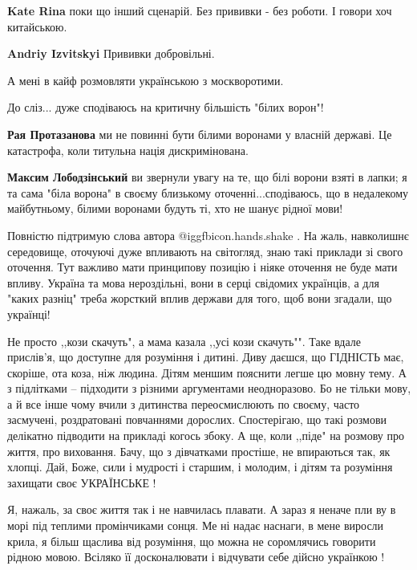 \begin{itemize}
\begin{itemize}
\textbf{Kate Rina} поки що інший сценарій. Без прививки - без роботи. І говори хоч китайською.

\textbf{Andriy Izvitskyi} Прививки добровільні.
\end{itemize} %

А мені в кайф розмовляти українською з москворотими.

До сліз... дуже сподіваюсь на критичну більшість "білих ворон"!

\begin{itemize} %
\textbf{Рая Протазанова} ми не повинні бути білими воронами у власній державі. Це катастрофа, коли титульна нація дискримінована.

\textbf{Максим Лободзінський} ви звернули увагу на те, що білі ворони взяті в лапки; я та сама "біла ворона" в своєму близькому оточенні...сподіваюсь, що в недалекому майбутньому, білими воронами будуть ті, хто не шанує рідної мови!
\end{itemize} %


Повністю підтримую слова автора @igg{fbicon.hands.shake} . На жаль, навколишнє середовище, оточуючі
дуже впливають на світогляд, знаю такі приклади зі свого оточення. Тут важливо
мати принципову позицію і ніяке оточення не буде мати впливу. Україна та мова
нероздільні, вони в серці свідомих українців, а для "каких разніц" треба
жорсткий вплив держави для того, щоб вони згадали, що українці!



Не просто ,,кози скачуть", а мама казала ,,усі кози скачуть"". Таке вдале
прислів'я, що доступне для розуміння і дитині. Диву даєшся, що ГІДНІСТЬ має,
скоріше, ота коза, ніж людина. Дітям меншим пояснити легше цю мовну тему. А з
підлітками -- підходити з різними аргументами неодноразово. Бо не тільки мову,
а й все інше чому вчили з дитинства переосмислюють по своєму, часто засмучені,
роздратовані повчаннями дорослих. Спостерігаю, що такі розмови делікатно
підводити на прикладі когось збоку. А ще, коли ,,піде" на розмову про життя,
про виховання. Бачу, що з дівчатками простіше, не впираються так, як хлопці.
Дай, Боже, сили і мудрості і старшим, і молодим, і дітям та розуміння захищати
своє УКРАЇНСЬКЕ !

Я, нажаль, за своє життя так і не навчилась плавати. А зараз я неначе пли ву в
морі під теплими промінчиками сонця. Ме ні надає наснаги, в мене виросли крила,
я більш щаслива від розуміння, що можна не соромлячись говорити рідною мовою.
Всіляко її досконалювати і відчувати себе дійсно українкою !


\end{itemize}
